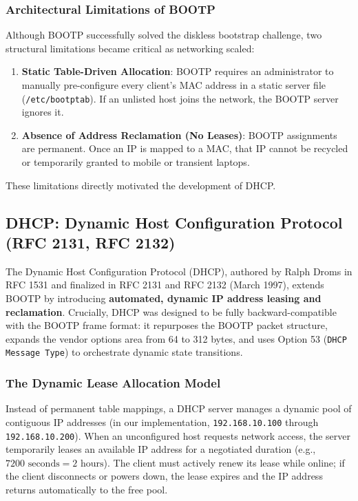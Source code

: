 \documentclass[12pt, a4paper]{article}
\begin{document}
\subsubsection{Architectural Limitations of BOOTP}
Although BOOTP successfully solved the diskless bootstrap challenge, two structural limitations became critical as networking scaled:
\begin{enumerate}
    \item \textbf{Static Table-Driven Allocation}: BOOTP requires an administrator to manually pre-configure every client's MAC address in a static server file (\texttt{/etc/bootptab}). If an unlisted host joins the network, the BOOTP server ignores it.
    \item \textbf{Absence of Address Reclamation (No Leases)}: BOOTP assignments are permanent. Once an IP is mapped to a MAC, that IP cannot be recycled or temporarily granted to mobile or transient laptops.
\end{enumerate}
These limitations directly motivated the development of DHCP.

\subsection{DHCP: Dynamic Host Configuration Protocol (RFC 2131, RFC 2132)}
The Dynamic Host Configuration Protocol (DHCP), authored by Ralph Droms in RFC 1531 and finalized in RFC 2131 and RFC 2132 (March 1997), extends BOOTP by introducing \textbf{automated, dynamic IP address leasing and reclamation}. Crucially, DHCP was designed to be fully backward-compatible with the BOOTP frame format: it repurposes the BOOTP packet structure, expands the vendor options area from 64 to 312 bytes, and uses Option 53 (\texttt{DHCP Message Type}) to orchestrate dynamic state transitions.

\subsubsection{The Dynamic Lease Allocation Model}
Instead of permanent table mappings, a DHCP server manages a dynamic pool of contiguous IP addresses (in our implementation, \texttt{192.168.10.100} through \texttt{192.168.10.200}). When an unconfigured host requests network access, the server temporarily leases an available IP address for a negotiated duration (e.g., $7200\text{ seconds} = 2\text{ hours}$). The client must actively renew its lease while online; if the client disconnects or powers down, the lease expires and the IP address returns automatically to the free pool.
\end{document}
